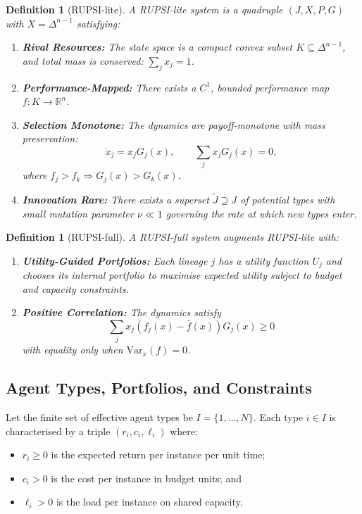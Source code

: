 \documentclass[12pt]{article}
\newtheorem{definition}[theorem]{Definition}
\newcommand{\R}{\mathbb{R}}
\newcommand{\Var}{\mathrm{Var}}
\begin{document}
\begin{definition}[RUPSI-lite]
\label{def:rupsi-lite}
A \emph{RUPSI-lite} system is a quadruple $(J, X, P, G)$ with $X = \Delta^{n-1}$ satisfying:
\begin{enumerate}
    \item[\textbf{(R)}] \textbf{Rival Resources:} The state space is a compact convex subset $K \subseteq \Delta^{n-1}$, and total mass is conserved: $\sum_j x_j = 1$.
    
    \item[\textbf{(P)}] \textbf{Performance-Mapped:} There exists a $C^1$, bounded performance map $f: K \to \R^n$.
    
    \item[\textbf{(S)}] \textbf{Selection Monotone:} The dynamics are payoff-monotone with mass preservation:
    \[
    \dot{x}_j = x_j G_j(x), \qquad \sum_j x_j G_j(x) = 0,
    \]
    where $f_j > f_k \Rightarrow G_j(x) > G_k(x)$.
    
    \item[\textbf{(I)}] \textbf{Innovation Rare:} There exists a superset $\tilde{J} \supseteq J$ of potential types with small mutation parameter $\nu \ll 1$ governing the rate at which new types enter.
\end{enumerate}
\end{definition}

\begin{definition}[RUPSI-full]
\label{def:rupsi-full}
A \emph{RUPSI-full} system augments RUPSI-lite with:
\begin{enumerate}
    \item[\textbf{(U)}] \textbf{Utility-Guided Portfolios:} Each lineage $j$ has a utility function $U_j$ and chooses its internal portfolio to maximise expected utility subject to budget and capacity constraints.
    
    \item[\textbf{(S-PC)}] \textbf{Positive Correlation:} The dynamics satisfy
    \[
    \sum_j x_j (f_j(x) - \bar{f}(x)) G_j(x) \geq 0
    \]
    with equality only when $\Var_x(f) = 0$.
\end{enumerate}
\end{definition}

\subsection{Agent Types, Portfolios, and Constraints}

Let the finite set of effective agent types be $I = \{1, \ldots, N\}$. Each type $i \in I$ is characterised by a triple $(r_i, c_i, \ell_i)$ where:
\begin{itemize}
    \item $r_i \geq 0$ is the expected return per instance per unit time;
    \item $c_i > 0$ is the cost per instance in budget units; and
    \item $\ell_i > 0$ is the load per instance on shared capacity.
\end{itemize}
\end{document}
